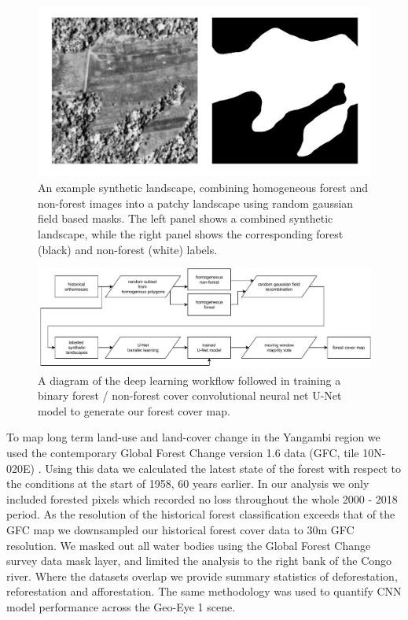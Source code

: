 \documentclass[remote sensing,article,submit,moreauthors,pdftex,10pt,a4paper]{mdpi}
\begin{document}
\begin{figure}
\includegraphics[width=1\linewidth]{./figures/synthetic_landscape} \caption{An example synthetic landscape, combining homogeneous forest and non-forest images into a patchy landscape using random gaussian field based masks. The left panel shows a combined synthetic landscape, while the right panel shows the corresponding forest (black) and non-forest (white) labels.}\label{fig:unnamed-chunk-3}
\end{figure}

\begin{figure}
\includegraphics[width=1\linewidth]{./figures/cnn_diagram} \caption{A diagram of the deep learning workflow followed in training a binary forest / non-forest cover convolutional neural net U-Net model to generate our forest cover map.}\label{fig:unnamed-chunk-4}
\end{figure}

To map long term land-use and land-cover change in the Yangambi region
we used the contemporary Global Forest Change version 1.6 data (GFC,
tile 10N-020E) \citep{hansen2013}. Using this data we calculated the
latest state of the forest with respect to the conditions at the start
of 1958, 60 years earlier. In our analysis we only included forested
pixels which recorded no loss throughout the whole 2000 - 2018 period.
As the resolution of the historical forest classification exceeds that
of the GFC map we downsampled our historical forest cover data to 30m
GFC resolution. We masked out all water bodies using the Global Forest
Change survey data mask layer, and limited the analysis to the right
bank of the Congo river. Where the datasets overlap we provide summary
statistics of deforestation, reforestation and afforestation. The same
methodology was used to quantify CNN model performance across the
Geo-Eye 1 scene.
\end{document}
